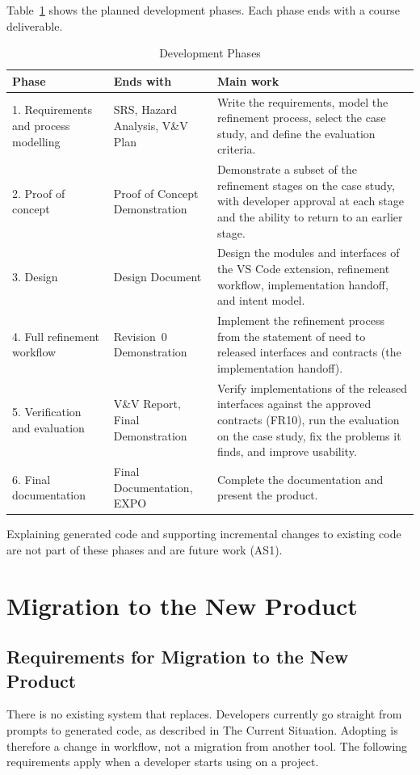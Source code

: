 \documentclass[12pt]{article}
\begin{document}
Table~\ref{TblPhases} shows the planned development phases. Each phase ends
with a course deliverable.

\begin{table}[h!]
\centering
\caption{Development Phases}
\label{TblPhases}
\begin{tabularx}{\textwidth}{p{3.4cm}p{2.6cm}X}
\toprule
\textbf{Phase} & \textbf{Ends with} & \textbf{Main work} \\
\midrule
1. Requirements and process modelling & SRS, Hazard Analysis, V\&V Plan &
Write the requirements, model the refinement process, select the case study,
and define the evaluation criteria. \\
2. Proof of concept & Proof of Concept Demonstration & Demonstrate a subset of
the refinement stages on the case study, with developer approval at each stage
and the ability to return to an earlier stage. \\
3. Design & Design Document & Design the modules and interfaces of the VS Code
extension, refinement workflow, implementation handoff, and intent model. \\
4. Full refinement workflow & Revision~0 Demonstration & Implement the
refinement process from the statement of need to released interfaces and
contracts (the implementation handoff). \\
5. Verification and evaluation & V\&V Report, Final Demonstration & Verify
implementations of the released interfaces against the approved contracts
(FR10), run the evaluation on the case study, fix the problems it finds, and improve
usability. \\
6. Final documentation & Final Documentation, EXPO & Complete the
documentation and present the product. \\
\bottomrule
\end{tabularx}
\end{table}

Explaining generated code and supporting incremental changes to existing code
are not part of these phases and are future work (AS1).

\section{Migration to the New Product}
\subsection{Requirements for Migration to the New Product}

There is no existing system that \progname{} replaces. Developers currently go
straight from prompts to generated code, as described in The Current Situation.
Adopting \progname{} is therefore a change in workflow, not a migration from
another tool. The following requirements apply when a developer starts using
\progname{} on a project.
\end{document}
